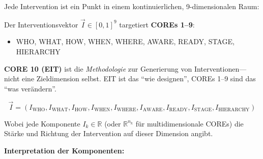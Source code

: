 Jede Intervention ist ein Punkt in einem kontinuierlichen, 9-dimensionalen Raum:

\begin{tcolorbox}[colback=yellow!5!white, colframe=yellow!75!black,
    title=\textbf{Warum 9D in einem 10C Framework?}]
Der Interventionsvektor $\vec{I} \in [0,1]^9$ targetiert \textbf{COREs 1--9}:
\begin{itemize}[nosep]
\item WHO, WHAT, HOW, WHEN, WHERE, AWARE, READY, STAGE, HIERARCHY
\end{itemize}
\textbf{CORE 10 (EIT)} ist die \textit{Methodologie} zur Generierung von Interventionen---nicht eine Zieldimension selbst. EIT ist das ``wie designen'', COREs 1--9 sind das ``was ver\"{a}ndern''.
\end{tcolorbox}

\begin{tcolorbox}[colback=blue!5!white, colframe=blue!75!black,
    title=\textbf{Definition: Der Interventionsvektor}]

\begin{equation}
\boxed{\vec{I} = (I_{\text{WHO}}, I_{\text{WHAT}}, I_{\text{HOW}}, I_{\text{WHEN}}, I_{\text{WHERE}}, I_{\text{AWARE}}, I_{\text{READY}}, I_{\text{STAGE}}, I_{\text{HIERARCHY}})}
\label{eq:17-intervention-vector}
\end{equation}

Wobei jede Komponente $I_k \in \mathbb{R}$ (oder $\mathbb{R}^{n_k}$ f\"{u}r multidimensionale COREs) die St\"{a}rke und Richtung der Intervention auf dieser Dimension angibt.

\end{tcolorbox}

\textbf{Interpretation der Komponenten:}


